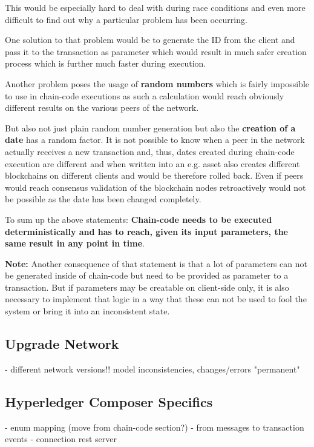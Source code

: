 This would be especially hard to deal with during race conditions and even more difficult to find out why a particular problem has been occurring.

One solution to that problem would be to generate the ID from the client and pass it to the transaction as parameter which would result in much safer creation process which is further much faster during execution.

Another problem poses the usage of \textbf{random numbers} which is fairly impossible to use in chain-code executions as such a calculation would reach obviously different results on the various peers of the network.

But also not just plain random number generation but also the \textbf{creation of a date} has a random factor. It is not possible to know when a peer in the network actually receives a new transaction and, thus, dates created during chain-code execution are different and when written into an e.g. asset also creates different blockchains on different clients and would be therefore rolled back. Even if peers would reach consensus validation of the blockchain nodes retroactively would not be possible as the date has been changed completely.

To sum up the above statements: \textbf{Chain-code needs to be executed deterministically and has to reach, given its input parameters, the same result in any point in time}.

\textbf{Note:} Another consequence of that statement is that a lot of parameters can not be generated inside of chain-code but need to be provided as parameter to a transaction. But if parameters may be creatable on client-side only, it is also necessary to implement that logic in a way that these can not be used to fool the system or bring it into an inconsistent state.

\subsection{Upgrade Network}

- different network versions!! model inconsistencies, changes/errors "permanent"

\subsection{Hyperledger Composer Specifics}

- enum mapping (move from chain-code section?)
- from messages to transaction events
- connection rest server

